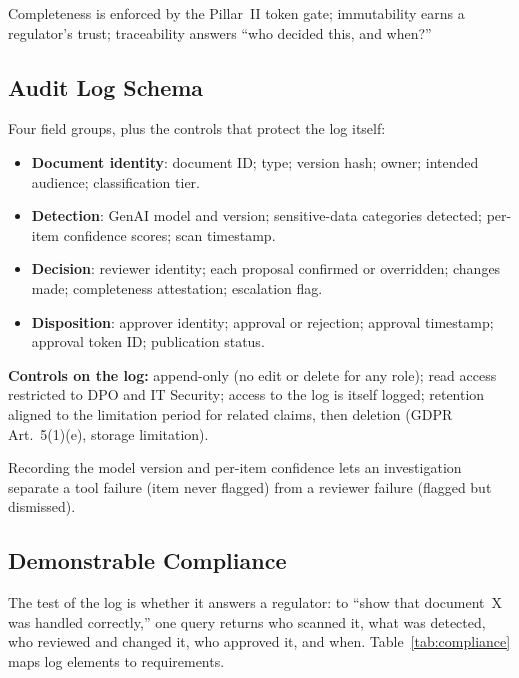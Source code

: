 \documentclass[12pt,a4paper]{article}
\begin{document}
Completeness is enforced by the Pillar~II token gate; immutability earns a regulator's trust; traceability answers ``who decided this, and when?''

\subsection{Audit Log Schema}

Four field groups, plus the controls that protect the log itself:

\begin{definitionbox}
\begin{itemize}
  \item \textbf{Document identity}: document ID; type; version hash; owner; intended audience; classification tier.
  \item \textbf{Detection}: GenAI model and version; sensitive-data categories detected; per-item confidence scores; scan timestamp.
  \item \textbf{Decision}: reviewer identity; each proposal confirmed or overridden; changes made; completeness attestation; escalation flag.
  \item \textbf{Disposition}: approver identity; approval or rejection; approval timestamp; approval token ID; publication status.
\end{itemize}
\textbf{Controls on the log:} append-only (no edit or delete for any role); read access restricted to DPO and IT Security; access to the log is itself logged; retention aligned to the limitation period for related claims, then deletion (GDPR Art.~5(1)(e), storage limitation).
\end{definitionbox}

Recording the model version and per-item confidence lets an investigation separate a tool failure (item never flagged) from a reviewer failure (flagged but dismissed).

\subsection{Demonstrable Compliance}

The test of the log is whether it answers a regulator: to ``show that document~X was handled correctly,'' one query returns who scanned it, what was detected, who reviewed and changed it, who approved it, and when. Table~\ref{tab:compliance} maps log elements to requirements.
\end{document}
